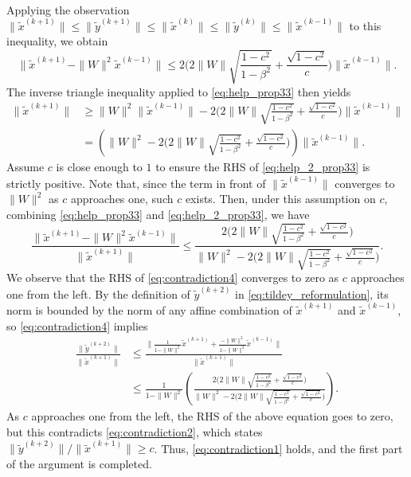 \documentclass[11pt]{article}
\begin{document}
{{\begin{align*}
\end{align*}
Applying the observation 
$\|\widetilde{x}^{(k+1)}\|\leq \|\widetilde{y}^{(k+1)}\|\leq\|\widetilde{x}^{(k)}\|\leq \|\widetilde{y}^{(k)}\|\leq \|\widetilde{x}^{(k-1)}\|$
to this inequality, we obtain
\begin{equation}\label{eq:help_prop33}
\big\|\widetilde{x}^{(k+1)}-\|W\|^2\widetilde{x}^{(k-1)}\big\|
\leq 2\Big(2\|W\|\sqrt{\frac{1-c^2}{1-\beta^2}}+\frac{\sqrt{1-c^2}}{c}\Big)\|\widetilde{x}^{(k-1)}\|.
\end{equation}
The inverse triangle inequality applied to \eqref{eq:help_prop33} then yields 
\begin{align}\label{eq:help_2_prop33}
\|\widetilde{x}^{(k+1)}\|&\geq \|W\|^2\|\widetilde{x}^{(k-1)}\|-2\Big(2\|W\|\sqrt{\frac{1-c^2}{1-\beta^2}}+\frac{\sqrt{1-c^2}}{c}\Big)\|\widetilde{x}^{(k-1)}\| \nonumber \\
&= \left( \|W\|^2-2\Big(2\|W\|\sqrt{\frac{1-c^2}{1-\beta^2}}+\frac{\sqrt{1-c^2}}{c}\Big)\right)\|\widetilde{x}^{(k-1)}\|.
\end{align}
Assume $c$ is close enough to $1$ to ensure the RHS of \eqref{eq:help_2_prop33} is strictly positive. Note that, since the term in front of $\|\widetilde{x}^{(k-1)}\|$ converges to $\|W\|^2$ as $c$ approaches one, such $c$ exists.
Then, under this assumption on $c$, combining \eqref{eq:help_prop33} and \eqref{eq:help_2_prop33}, we have 
\begin{equation}\label{eq:contradiction4}
\frac{\|\widetilde{x}^{(k+1)}- \|W\|^2\widetilde{x}^{(k-1)}\|}{\|\widetilde{x}^{(k+1)}\|}\leq \frac{2\Big(2\|W\|\sqrt{\frac{1-c^2}{1-\beta^2}}+\frac{\sqrt{1-c^2}}{c}\Big)}{\|W\|^2-2\Big(2\|W\|\sqrt{\frac{1-c^2}{1-\beta^2}}+\frac{\sqrt{1-c^2}}{c}\Big)}.
\end{equation} 
We observe that the RHS of \eqref{eq:contradiction4} converges to zero as $c$ approaches one from the left.  
By the definition of $\widetilde{y}^{(k+2)}$ in \eqref{eq:tildey_reformulation}, its norm is bounded by the norm of any affine combination of $\widetilde{x}^{(k+1)}$ and $\widetilde{x}^{(k-1)}$, so \eqref{eq:contradiction4} implies 
\begin{align*}
\frac{\|\widetilde{y}^{(k+2)}\|}{\|\widetilde{x}^{(k+1)}\|}&\leq 
\frac{\Big\|\frac{1}{1-\|W\|^2}\widetilde{x}^{(k+1)}+\frac{-\|W\|^2}{1-\|W\|^2}\widetilde{x}^{(k-1)}\Big\|}{\|\widetilde{x}^{(k+1)}\|} \nonumber \\
&\leq \frac{1}{{1-\|W\|^2}}\left(\frac{2\Big(2\|W\|\sqrt{\frac{1-c^2}{1-\beta^2}}+\frac{\sqrt{1-c^2}}{c}\Big)}{{\|W\|^2}-2\Big(2\|W\|\sqrt{\frac{1-c^2}{1-\beta^2}}+\frac{\sqrt{1-c^2}}{c}\Big)}\right). \nonumber 
\end{align*}
As $c$ approaches one from the left, the RHS of the above equation goes to zero, but this contradicts \eqref{eq:contradiction2}, which states  $\|\widetilde{y}^{(k+2)}\|/\|\widetilde{x}^{(k+1)}\|\geq c$. 
Thus, \eqref{eq:contradiction1} holds, and the first part of the argument is completed.

}}
\end{document}
